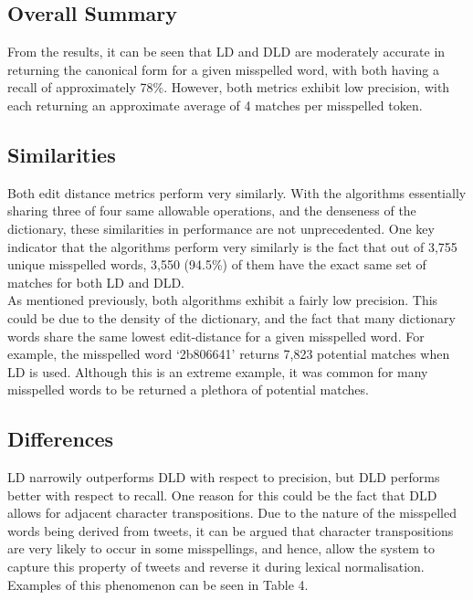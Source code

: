 \documentclass[11pt]{article}
\begin{document}


\subsection{Overall Summary}
From the results, it can be seen that LD and DLD are moderately accurate in returning the canonical form for a given misspelled word, with both having a recall of approximately 78\%. However, both metrics exhibit low precision, with each returning an approximate average of 4 matches per misspelled token.


\subsection{Similarities}
Both edit distance metrics perform very similarly. With the algorithms essentially sharing three of four same allowable operations, and the denseness of the dictionary, these similarities in performance are not unprecedented. One key indicator that the algorithms perform very similarly is the fact that out of 3,755 unique misspelled words, 3,550 (94.5\%) of them have the exact same set of matches for both LD and DLD.
\\

As mentioned previously, both algorithms exhibit a fairly low precision. This could be due to the density of the dictionary, and the fact that many dictionary words share the same lowest edit-distance for a given misspelled word. For example, the misspelled word `2b806641'  returns 7,823 potential matches when LD is used. Although this is an extreme example, it was common for many misspelled words to be returned a plethora of potential matches.


\subsection{Differences}

LD narrowily outperforms DLD with respect to precision, but DLD performs better with respect to recall. One reason for this could be the fact that  DLD allows for adjacent character transpositions. Due to the nature of the misspelled words being derived from tweets, it can be argued that character transpositions are very likely to occur in some misspellings, and hence, allow the system to capture this property of tweets and reverse it during lexical normalisation. Examples of this phenomenon can be seen in Table 4.
\\
\end{document}
